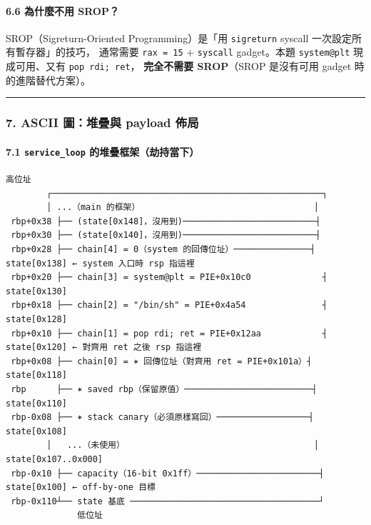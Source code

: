 \documentclass[10pt,a4paper]{article}
\begin{document}
\paragraph{6.6 為什麼不用
SROP？}\label{ux70baux4ec0ux9ebcux4e0dux7528-srop}

SROP（Sigreturn-Oriented Programming）是「用 \texttt{sigreturn} syscall
一次設定所有暫存器」的技巧， 通常需要 \texttt{rax\ \allowbreak{}=\ \allowbreak{}15} +
\texttt{syscall} gadget。本題 \texttt{system@plt} 現成可用、又有
\texttt{pop\ \allowbreak{}rdi;\ \allowbreak{}ret}， \textbf{完全不需要 SROP}（SROP 是沒有可用
gadget 時的進階替代方案）。

\begin{center}\rule{0.5\linewidth}{0.5pt}\end{center}

\subsubsection{7. ASCII 圖：堆疊與 payload
佈局}\label{ascii-ux5716ux5806ux758aux8207-payload-ux4f48ux5c40}

\paragraph{\texorpdfstring{7.1 \texttt{service\_\allowbreak{}loop}
的堆疊框架（劫持當下）}{7.1 service\_loop 的堆疊框架（劫持當下）}}\label{service_loop-ux7684ux5806ux758aux6846ux67b6ux52abux6301ux7576ux4e0b}

\begin{Verbatim}[breaklines=true,breakanywhere=true,breakautoindent=false,fontsize=\fontsize{7.0}{9.5}\selectfont]
              高位址
        ┌─────────────────────────────────────────────────────┐
        │ ...（main 的框架）                                  │
 rbp+0x38 ├── (state[0x148]，沒用到)──────────────────────────┤
 rbp+0x30 ├── (state[0x140]，沒用到)──────────────────────────┤
 rbp+0x28 ├── chain[4] = 0（system 的回傳位址）───────────────┤  state[0x138] ← system 入口時 rsp 指這裡
 rbp+0x20 ├── chain[3] = system@plt = PIE+0x10c0              ┤  state[0x130]
 rbp+0x18 ├── chain[2] = "/bin/sh" = PIE+0x4a54               ┤  state[0x128]
 rbp+0x10 ├── chain[1] = pop rdi; ret = PIE+0x12aa            ┤ state[0x120] ← 對齊用 ret 之後 rsp 指這裡
 rbp+0x08 ├── chain[0] = ✶ 回傳位址（對齊用 ret = PIE+0x101a）┤ state[0x118]
 rbp      ├── ✶ saved rbp（保留原值）─────────────────────────┤  state[0x110]
 rbp-0x08 ├── ✶ stack canary（必須原樣寫回）──────────────────┤  state[0x108]
        │   ...（未使用）                                     │  state[0x107..0x000]
 rbp-0x10 ├── capacity（16-bit 0x1ff）────────────────────────┤  state[0x100] ← off-by-one 目標
 rbp-0x110┴── state 基底 ─────────────────────────────────────┘
              低位址
\end{Verbatim}
\end{document}
